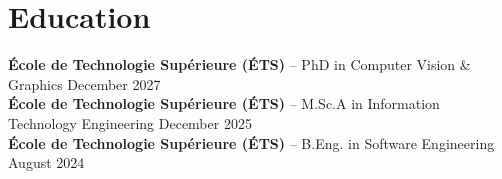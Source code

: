 \documentclass[11pt]{article}       %
\begin{document}



\vspace{-18.5pt}

\section*{Education}
\ifdefined\cvResearch
      \textbf{École de Technologie Supérieure (ÉTS)} -- PhD in Computer Vision \& Graphics \hfill December 2027 \\
\fi
\ifdefined\cvEngineering
      \textbf{École de Technologie Supérieure (ÉTS)} -- M.Sc.A in Information Technology Engineering \hfill December 2025 \\
\fi
\textbf{École de Technologie Supérieure (ÉTS)} -- B.Eng. in Software Engineering \hfill August 2024
\end{document}
